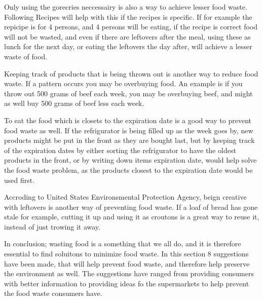 Only using the gorecries neccessairy is also a way to achieve lesser food waste. Following Recipes will help with this if the recipes is specific. If for example the repicipe is for 4 persons, and 4 persons will be eating, if the recipe is correct food will not be wasted, and even if there are leftovers after the meal, using these as lunch for the next day, or eating the leftovers the day after, will achieve a lesser waste of food. %

Keeping track of products that is being thrown out is another way to reduce food waste. If a pattern occurs you may be overbuying food. An example is if you throw out 500 grams of beef each week, you may be overbuying beef, and might as well buy 500 grams of beef less each week. %

To eat the food which is closets to the expiration date is a good way to prevent food waste as well. If the refrigurator is being filled up as the week goes by, new products might be put in the front as they are bought last, but by keeping track of the expiration dates by either sorting the refrigurator to have the oldest products in the front, or by writing down items expiration date, would help solve the food waste problem, as the products closest to the expiration date would be used first.

Accroding to United States Environsmental Protection Agency, beign creative with leftovers is another way of preventing food waste. If a loaf of bread has gone stale for example, cutting it up and using it as croutons is a great way to reuse it, instead of just trowing it away. %

In conclusion; wasting food is a something that we all do, and it is therefore essential to find soluitons to minimize food waste. In this section 8 suggestions have been made, that will help prevent food waste, and therefore help preserve the environment as well. The suggestions have ranged from providing consumers with better information to providing ideas fo the supermarkets to help prevent the food waste consumers have.